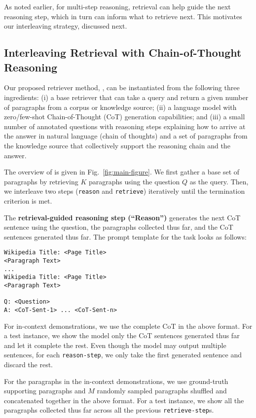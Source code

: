 As noted earlier, for multi-step reasoning, retrieval can help guide the next reasoning step, which in turn can inform what to retrieve next. This motivates our interleaving strategy, discussed next.

\subsection{Interleaving Retrieval with Chain-of-Thought Reasoning}
\label{subsec:retriever}

Our proposed retriever method, \iconsys, can be instantiated from the following three ingredients: (i) a base retriever that can take a query and return a given number of paragraphs from a corpus or knowledge source; (ii) a language model with zero/few-shot Chain-of-Thought (CoT) generation capabilities; and (iii) a small number of annotated questions with reasoning steps explaining how to arrive at the answer in natural language (chain of thoughts) and a set of paragraphs from the knowledge source that collectively support the reasoning chain and the answer.

The overview of \iconsys is given in Fig.~\ref{fig:main-figure}. We first gather a base set of paragraphs by retrieving $K$ paragraphs using the question $Q$ as the query. Then, we interleave two steps (\texttt{reason} and \texttt{retrieve}) iteratively until the termination criterion is met.

The \textbf{retrieval-guided reasoning step (``Reason'')} generates the next CoT sentence using the question, the paragraphs collected thus far, and the CoT sentences generated thus far. The prompt template for the task looks as follows:

\begin{small}
\begin{verbatim}
Wikipedia Title: <Page Title>
<Paragraph Text>
...
Wikipedia Title: <Page Title>
<Paragraph Text>

Q: <Question>
A: <CoT-Sent-1> ... <CoT-Sent-n>
\end{verbatim}
\end{small}
 
For in-context demonstrations, we use the complete CoT in the above format. For a test instance, we show the model only the CoT sentences generated thus far and let it complete the rest. Even though the model may output multiple sentences, for each \texttt{reason-step}, we only take the first generated sentence and discard the rest.

For the paragraphs in the in-context demonstrations, we use ground-truth supporting paragraphs and $M$ randomly sampled paragraphs shuffled and concatenated together in the above format. For a test instance, we show all the paragraphs collected thus far across all the previous \texttt{retrieve-step}s.

